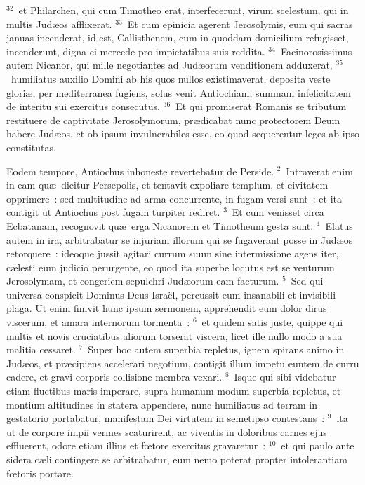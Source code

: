 ${}^{32}$~et Philarchen, qui cum Timotheo erat, interfecerunt, virum scelestum, qui in multis Jud\ae os afflixerat.
${}^{33}$~Et cum epinicia agerent Jerosolymis, eum qui sacras januas incenderat, id est, Callisthenem, cum in quoddam domicilium refugisset, incenderunt, digna ei mercede pro impietatibus suis reddita.
${}^{34}$~Facinorosissimus autem Nicanor, qui mille negotiantes ad Jud\ae orum venditionem adduxerat,
${}^{35}$~humiliatus auxilio Domini ab his quos nullos existimaverat, deposita veste glori\ae , per mediterranea fugiens, solus venit Antiochiam, summam infelicitatem de interitu sui exercitus consecutus.
${}^{36}$~Et qui promiserat Romanis se tributum restituere de captivitate Jerosolymorum, pr\ae dicabat nunc protectorem Deum habere Jud\ae os, et ob ipsum invulnerabiles esse, eo quod sequerentur leges ab ipso constitutas.

\bchapter
\lettrine[lines=3,image=true,loversize=0.05,lraise=-0.03]{E}{}odem tempore, Antiochus inhoneste revertebatur de Perside.
${}^{2}$~Intraverat enim in eam qu\ae\ dicitur Persepolis, et tentavit expoliare templum, et civitatem opprimere~: sed multitudine ad arma concurrente, in fugam versi sunt~: et ita contigit ut Antiochus post fugam turpiter rediret.
${}^{3}$~Et cum venisset circa Ecbatanam, recognovit qu\ae\ erga Nicanorem et Timotheum gesta sunt.
${}^{4}$~Elatus autem in ira, arbitrabatur se injuriam illorum qui se fugaverant posse in Jud\ae os retorquere~: ideoque jussit agitari currum suum sine intermissione agens iter, c\ae lesti eum judicio perurgente, eo quod ita superbe locutus est se venturum Jerosolymam, et congeriem sepulchri Jud\ae orum eam facturum.
${}^{5}$~Sed qui universa conspicit Dominus Deus Isra\"el, percussit eum insanabili et invisibili plaga. Ut enim finivit hunc ipsum sermonem, apprehendit eum dolor dirus viscerum, et amara internorum tormenta~:
${}^{6}$~et quidem satis juste, quippe qui multis et novis cruciatibus aliorum torserat viscera, licet ille nullo modo a sua malitia cessaret.
${}^{7}$~Super hoc autem superbia repletus, ignem spirans animo in Jud\ae os, et pr\ae cipiens accelerari negotium, contigit illum impetu euntem de curru cadere, et gravi corporis collisione membra vexari.
${}^{8}$~Isque qui sibi videbatur etiam fluctibus maris imperare, supra humanum modum superbia repletus, et montium altitudines in statera appendere, nunc humiliatus ad terram in gestatorio portabatur, manifestam Dei virtutem in semetipso contestans~:
${}^{9}$~ita ut de corpore impii vermes scaturirent, ac viventis in doloribus carnes ejus effluerent, odore etiam illius et fœtore exercitus gravaretur~:
${}^{10}$~et qui paulo ante sidera c\ae li contingere se arbitrabatur, eum nemo poterat propter intolerantiam fœtoris portare.


